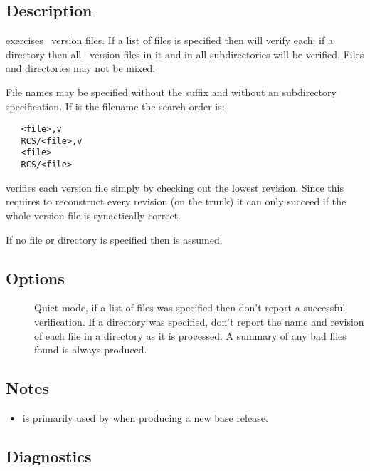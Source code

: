 \subsection*{Description}

 exercises \rcs\ version files.  If a list of files is specified
then  will verify each; if a directory then all \rcs\ version files
in it and in all subdirectories will be verified.  Files and directories may
not be mixed.

File names may be specified without the  suffix and without an
 subdirectory specification.  If  is the filename the
search order is:

\begin{verbatim}
   <file>,v
   RCS/<file>,v
   <file>
   RCS/<file>
\end{verbatim}

 verifies each version file simply by checking out the lowest
revision.  Since this requires  to reconstruct every revision (on
the trunk) it can only succeed if the whole version file is synactically
correct.

If no file or directory is specified then  is assumed.

\subsection*{Options}

\begin{description}
\item[]
   Quiet mode, if a list of files was specified then don't report a successful
   verification.  If a directory was specified, don't report the name and
   revision of each file in a directory as it is processed.  A summary of any
   bad files found is always produced.
\end{description}

\subsection*{Notes}
 
\begin{itemize}
\item
    is primarily used by  when producing a new base
   release.
\end{itemize}

\subsection*{Diagnostics}

